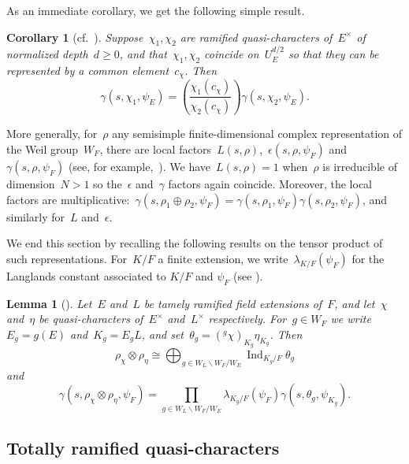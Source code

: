 \documentclass[12pt]{amsart}
\newcommand{\Ind}{\operatorname{Ind}}
\newtheorem{cor}[thm]{Corollary}
\newtheorem{lem}[thm]{Lemma}
\newtheorem{cor}[equation]{Corollary}
\newtheorem{lem}[equation]{Lemma}
\begin{document}
As an immediate corollary, we get the following simple result.

\begin{cor}[{cf.~\cite[Lemma~4.3]{A22}}]\label{cor:lem2}
Suppose~$\chi_1,\chi_2$ are ramified quasi-characters of~$E^\times$ of normalized depth~$d\ge 0$, and that~$\chi_1,\chi_2$ coincide on~$U_E^{d/2}$ so that they can be represented by a common element~$c_\chi$. Then
\[
\gamma(s, \chi_1, \psi_E) = 
\left(\frac{\chi_1(c_\chi)}{\chi_2(c_\chi)}\right)\gamma(s, \chi_2, \psi_E).
\]
\end{cor}

More generally, for~$\rho$ any semisimple finite-dimensional complex representation of the Weil group~$W_F$, there are local factors~$L(s,\rho)$,~$\epsilon(s,\rho,\psi_F)$ and~$\gamma(s,\rho,\psi_F)$ (see, for example,~\cite[Theorem~29.4]{BH06}). We have~$L(s,\rho)=1$ when~$\rho$ is irreducible of dimension~$N>1$ so the~$\epsilon$ and~$\gamma$ factors again coincide. Moreover, the local factors are multiplicative:~$\gamma(s,\rho_1\oplus\rho_2,\psi_F)=\gamma(s,\rho_1,\psi_F)\gamma(s,\rho_2,\psi_F)$, and similarly for~$L$ and~$\epsilon$.

We end this section by recalling the following results on the tensor product of such representations. For~$K/F$ a finite extension, we write~$\lambda_{K/F}(\psi_F)$ for the Langlands constant associated to $K/F$ and $\psi_F$ (see \cite[Theorem~29.4 and~\S34.3]{BH06}).

\begin{lem}[{\cite[Lemmas~2.4,~2.5]{ALST18}}]\label{lem1}
Let~$E$ and~$L$ be tamely ramified field extensions of~$F$, and let~$\chi$ and~$\eta$ be quasi-characters of~$E^\times$ and~$L^\times$ respectively. For~$g\in W_F$ we write~$E_g=g(E)$ and~$K_g=E_gL$, and set~$\theta_g=({}^g\chi)_{K_g} \eta_{K_g}$. Then
\[
\rho_\chi\otimes \rho_\eta \cong \bigoplus_{g\in W_L\backslash W_F/W_E} \Ind_{K_g/F} \theta_g
\]
and
\[
\gamma(s, \rho_\chi  \otimes \rho_\eta, \psi_F) = \prod_{g\in W_L\backslash W_F/W_E}
\lambda_{K_g/F}(\psi_F)\gamma(s,\theta_g, \psi_{K_g}).
\]
\end{lem}


\subsection{Totally ramified quasi-characters}
\end{document}
